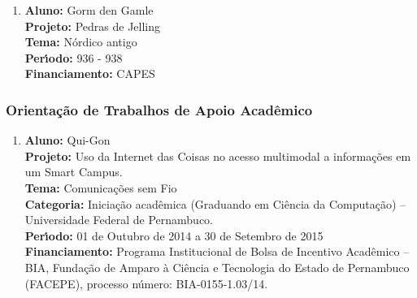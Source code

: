\documentclass[a4paper,oneside,10pt]{article}
\begin{document}
\begin{enumerate}
\renewcommand{\labelenumi}{{\large\bfseries\arabic{enumi}.}}

\item   \textbf{Aluno:} Gorm den Gamle \mbox{} \\
        \textbf{Projeto:} Pedras de Jelling \\
        \textbf{Tema:} Nórdico antigo \\
        \textbf{Per\'{\i}odo:} 936 - 938\\
        \textbf{Financiamento:} CAPES

\end{enumerate}


\subsubsection{Orienta\c{c}\~{a}o de Trabalhos de Apoio Acad\^{e}mico}
\vspace{0.3cm}

\begin{enumerate}
\renewcommand{\labelenumi}{{\large\bfseries\arabic{enumi}.}}

\item   \textbf{Aluno:} Qui-Gon \mbox{}\\
        \textbf{Projeto:} Uso da Internet das Coisas no acesso multimodal a informações em um Smart Campus.\\
        \textbf{Tema:} Comunica\c{c}\~{o}es sem Fio \\
        \textbf{Categoria:} Iniciação acadêmica (Graduando em Ciência da Computação) – Universidade Federal de Pernambuco.\\
        \textbf{Per\'{\i}odo:} 01 de Outubro de 2014 a 30 de Setembro de 2015 \\
        \textbf{Financiamento:} Programa Institucional de Bolsa de Incentivo Acadêmico – BIA, Fundação de Amparo à Ciência e Tecnologia do Estado de Pernambuco (FACEPE), processo número: BIA-0155-1.03/14.

\end{enumerate}

\end{document}
